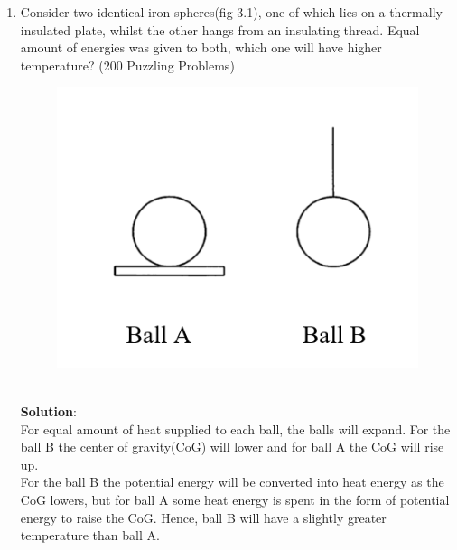 \begin{enumerate}
    \item Consider two identical iron spheres(fig 3.1), one of which lies on a thermally insulated plate, whilst the other hangs from an insulating thread. Equal amount of energies was given to both, which one will have higher temperature? (200 Puzzling Problems)\\
    \begin{figure}[htp]
        \centering
        \includegraphics{figures/thermo/thermo3.1.PNG}
        \caption{}
        \label{fig:thermo3.1}
    \end{figure}
\\
\textbf{Solution}:\\
    For equal amount of heat supplied to each ball, the balls will expand. For the ball B the center of gravity(CoG) will lower and for ball A the CoG will rise up. \\
    For the ball B the potential energy will be converted into heat energy as the CoG lowers, but for ball A some heat energy is spent in the form of potential energy to raise the CoG. Hence, ball B will have a slightly greater temperature than ball A.


\end{enumerate}
